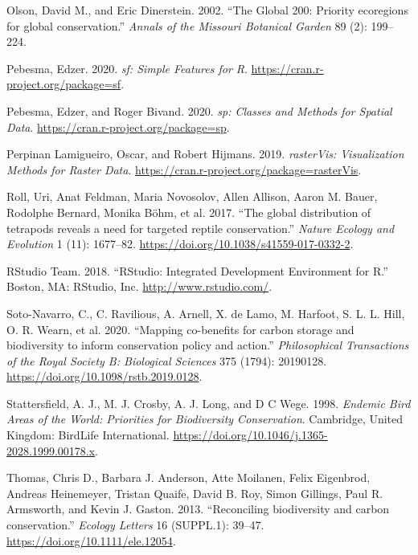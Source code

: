 \documentclass[
]{article}
\begin{document}
\leavevmode\hypertarget{ref-Olson2002}{}%
Olson, David M., and Eric Dinerstein. 2002. ``The Global 200: Priority ecoregions for global conservation.'' \emph{Annals of the Missouri Botanical Garden} 89 (2): 199--224.

\leavevmode\hypertarget{ref-R-sf}{}%
Pebesma, Edzer. 2020. \emph{sf: Simple Features for R}. \url{https://cran.r-project.org/package=sf}.

\leavevmode\hypertarget{ref-R-sp}{}%
Pebesma, Edzer, and Roger Bivand. 2020. \emph{sp: Classes and Methods for Spatial Data}. \url{https://cran.r-project.org/package=sp}.

\leavevmode\hypertarget{ref-R-rasterVis}{}%
Perpinan Lamigueiro, Oscar, and Robert Hijmans. 2019. \emph{rasterVis: Visualization Methods for Raster Data}. \url{https://cran.r-project.org/package=rasterVis}.

\leavevmode\hypertarget{ref-Roll2017}{}%
Roll, Uri, Anat Feldman, Maria Novosolov, Allen Allison, Aaron M. Bauer, Rodolphe Bernard, Monika Böhm, et al. 2017. ``The global distribution of tetrapods reveals a need for targeted reptile conservation.'' \emph{Nature Ecology and Evolution} 1 (11): 1677--82. \url{https://doi.org/10.1038/s41559-017-0332-2}.

\leavevmode\hypertarget{ref-RStudioTeam2018}{}%
RStudio Team. 2018. ``RStudio: Integrated Development Environment for R.'' Boston, MA: RStudio, Inc. \url{http://www.rstudio.com/}.

\leavevmode\hypertarget{ref-Soto-Navarro2020}{}%
Soto-Navarro, C., C. Ravilious, A. Arnell, X. de Lamo, M. Harfoot, S. L. L. Hill, O. R. Wearn, et al. 2020. ``Mapping co-benefits for carbon storage and biodiversity to inform conservation policy and action.'' \emph{Philosophical Transactions of the Royal Society B: Biological Sciences} 375 (1794): 20190128. \url{https://doi.org/10.1098/rstb.2019.0128}.

\leavevmode\hypertarget{ref-Stattersfield1998}{}%
Stattersfield, A. J., M. J. Crosby, A. J. Long, and D C Wege. 1998. \emph{Endemic Bird Areas of the World: Priorities for Biodiversity Conservation}. Cambridge, United Kingdom: BirdLife International. \url{https://doi.org/10.1046/j.1365-2028.1999.00178.x}.

\leavevmode\hypertarget{ref-Thomas2013}{}%
Thomas, Chris D., Barbara J. Anderson, Atte Moilanen, Felix Eigenbrod, Andreas Heinemeyer, Tristan Quaife, David B. Roy, Simon Gillings, Paul R. Armsworth, and Kevin J. Gaston. 2013. ``Reconciling biodiversity and carbon conservation.'' \emph{Ecology Letters} 16 (SUPPL.1): 39--47. \url{https://doi.org/10.1111/ele.12054}.
\end{document}
